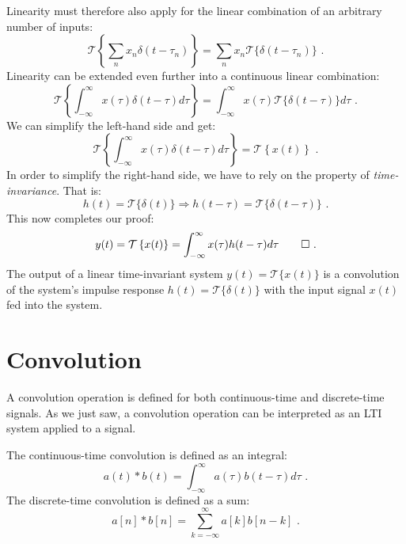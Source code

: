 Linearity must therefore also apply for the linear combination of an arbitrary number of inputs:
\begin{equation}
  \mathcal{T}\left\{\sum_n x_n \delta(t-\tau_n)\right\} = \sum_n x_n \mathcal{T}\{\delta(t-\tau_n)\}\,\,.
\end{equation}
Linearity can be extended even further into a continuous linear combination:
\begin{equation}
  \mathcal{T}\left\{\int_{-\infty}^{\infty} x(\tau)\delta(t-\tau)d\tau\right\} = \int_{-\infty}^{\infty} x(\tau) \mathcal{T}\{\delta(t-\tau)\} d\tau\,\,.
\end{equation}
We can simplify the left-hand side and get:
\begin{equation}
  \mathcal{T}\left\{\int_{-\infty}^{\infty} x(\tau)\delta(t-\tau)d\tau\right\} = \mathcal{T}\left\{x(t)\right\}\,\,.
\end{equation}
In order to simplify the right-hand side, we have to rely on the property of \emph{time-invariance}. That is:
\begin{equation}
  h(t) = \mathcal{T}\{\delta(t)\} \Rightarrow h(t-\tau) = \mathcal{T}\{\delta(t-\tau)\}\,\,.
\end{equation}
This now completes our proof:
\begin{equation}
  y(t) = \mathcal{T}\left\{x(t)\right\} = \int_{-\infty}^{\infty} x(\tau) h(t-\tau) d\tau \qed\,\,.
\end{equation}
The output of a linear time-invariant system $y(t)=\mathcal{T}\{x(t)\}$ is a convolution of the system's
impulse response $h(t)=\mathcal{T}\{\delta(t)\}$ with the input signal $x(t)$ fed into the system.

\section{Convolution}

A convolution operation is defined for both continuous-time and
discrete-time signals. As we just saw, a convolution operation can be
interpreted as an LTI system applied to a signal.

The continuous-time convolution is defined as an integral:
\begin{equation}
  \boxed{
    a(t)*b(t) = \int_{-\infty}^{\infty}a(\tau)b(t-\tau)d\tau\,\,.
  }
\end{equation}
The discrete-time convolution is defined as a sum:
\begin{equation}
  \boxed{
  a[n]*b[n] = \sum_{k=-\infty}^{\infty}a[k]b[n-k]\,\,.
  }
\end{equation}

